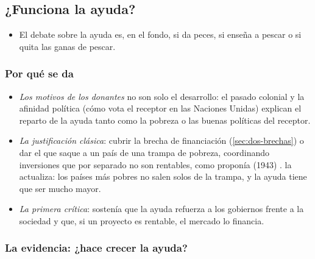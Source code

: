 \documentclass[11pt]{article}
\begin{document}
\subsection{¿Funciona la ayuda?}\label{sec:aod-eficacia}

\begin{itemize}
\item El debate sobre la ayuda es, en el fondo, si da peces, si enseña a pescar o si quita las ganas de pescar.
\end{itemize}

\subsubsection{Por qué se da}\label{sec:aod-motivos}

\begin{itemize}
\item \emph{Los motivos de los donantes} no son solo el desarrollo: el pasado colonial y la afinidad política (cómo vota el receptor en las Naciones Unidas) explican el reparto de la ayuda tanto como la pobreza o las buenas políticas del receptor\nocite{AlesinaDollar2000}.
\item \emph{La justificación clásica}: cubrir la brecha de financiación (\ref{sec:dos-brechas}) o dar el  que saque a un país de una trampa de pobreza, coordinando inversiones que por separado no son rentables, como proponía  (1943) . \textcite{Sachs2005} la actualiza: los países más pobres no salen solos de la trampa, y la ayuda tiene que ser mucho mayor.
\item \emph{La primera crítica}: \textcite{Bauer1972} sostenía que la ayuda refuerza a los gobiernos frente a la sociedad y que, si un proyecto es rentable, el mercado lo financia.
\end{itemize}

\subsubsection{La evidencia: ¿hace crecer la ayuda?}\label{sec:aod-evidencia}
\end{document}
